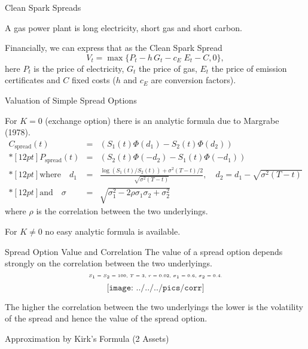 {Clean Spark Spreads}
\item<1-> A gas power plant is  long electricity, short gas and short carbon.
\item<2-> Financially, we can express that as the Clean Spark Spread
\begin{equation}
V_t = \max\{P_t - h\,G_t - c_E\;E_t - C, 0\},
\label{spark_spread_value}
\end{equation}
here  $P_t$ is the price of electricity, $G_t$ the price of gas, $E_t$ the price of emission certificates  and $C$ fixed costs ($h$ and $c_E$ are conversion factors).


{Valuation of Simple Spread Options}

For $K=0$ (exchange option) there is an analytic formula due to
Margrabe (1978).
$$\begin{array}{lll}
 C_{\mbox{spread}}(t) & = & (S_1(t)\Phi(d_1)-S_2(t)\Phi(d_2))
 \\*[12pt]
 P_{\mbox{spread}}(t) & = & (S_2(t)\Phi(-d_2)-S_1(t)\Phi(-d_1))
 \\*[12pt]
 \mbox{where}\quad d_1 & = & \frac{\log(S_1(t)/S_2(t))+\sigma^{2}(T-t)/2}{\sqrt{\sigma^{2}(T-t)}},\quad d_2=d_1-\sqrt{\sigma^{2}(T-t)}
 \\*[12pt]
 \mbox{and}\quad \sigma & = & \sqrt{\sigma_1^2-2\rho\sigma_1\sigma_2+\sigma_2^2}
\end{array}$$
where $\rho$ is the correlation between the two underlyings.

For $K\neq 0$ no easy analytic formula is available.

{Spread Option Value and Correlation}
The value of a spread option depends strongly on the correlation between the two underlyings.
$$\tiny\text{$S_1=S_2=100$, $T=3$, $r=0.02$, $\sigma_1=0.6$, $\sigma_2=0.4$.}$$
\vspace{-0.76cm}
$$\texttt{[image: ../../../pics/corr]}$$
\vspace{-1cm}
\item The higher the correlation between the two underlyings the lower is the volatility of the spread and hence the value of the spread option.

{Approximation by Kirk's Formula (2 Assets)}

